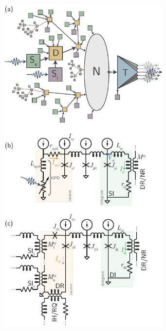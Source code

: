 \documentclass[twocolumn]{article}
\begin{document}
\begin{figure}[h!]
\includegraphics[width=8.6cm]{figures/_02__schematic__circuits.pdf}
\end{figure}
\end{document}
